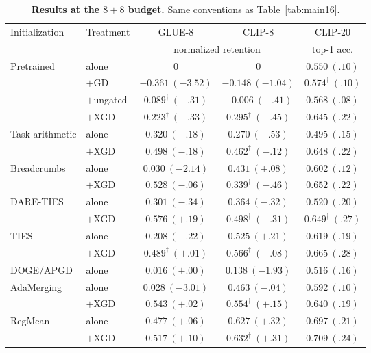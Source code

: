 \documentclass{article} %
\begin{document}
\begin{table}[t]
\centering
\scriptsize
\setlength{\tabcolsep}{3.5pt}
\caption{\textbf{Results at the $8{+}8$ budget.} Same conventions as Table~\ref{tab:main16}.}
\label{tab:main8}
\renewcommand{\arraystretch}{0.95}
\begin{tabular}{llccc}
\toprule
Initialization & Treatment & GLUE-8 & CLIP-8 & CLIP-20 \\
 & & \multicolumn{2}{c}{normalized retention} & top-1 acc. \\
\midrule
Pretrained      & alone      & $0$ & $0$ & $0.550\ (.10)$ \\
                & $+$GD      & $-0.361\ ({-}3.52)$ & $-0.148\ ({-}1.04)$ & $0.574^{\dagger}\ (.10)$ \\
                & $+$ungated & $0.089^{\dagger}\ ({-}.31)$ & $-0.006\ ({-}.41)$ & $0.568\ (.08)$ \\
                & $+$XGD     & $0.223^{\dagger}\ ({-}.33)$ & $0.295^{\dagger}\ ({-}.45)$ & $0.645\ (.22)$ \\
\midrule
Task arithmetic & alone      & $0.320\ ({-}.18)$ & $0.270\ ({-}.53)$ & $0.495\ (.15)$ \\
                & $+$XGD     & $0.498\ ({-}.18)$ & $0.462^{\dagger}\ ({-}.12)$ & $0.648\ (.22)$ \\
\midrule
Breadcrumbs     & alone      & $0.030\ ({-}2.14)$ & $0.431\ ({+}.08)$ & $0.602\ (.12)$ \\
                & $+$XGD     & $0.528\ ({-}.06)$ & $0.339^{\dagger}\ ({-}.46)$ & $0.652\ (.22)$ \\
\midrule
DARE-TIES       & alone      & $0.301\ ({-}.34)$ & $0.364\ ({-}.32)$ & $0.520\ (.20)$ \\
                & $+$XGD     & $\mathbf{0.576}\ ({+}.19)$ & $0.498^{\dagger}\ ({-}.31)$ & $0.649^{\dagger}\ (.27)$ \\
\midrule
TIES            & alone      & $0.208\ ({-}.22)$ & $0.525\ ({+}.21)$ & $0.619\ (.19)$ \\
                & $+$XGD     & $0.489^{\dagger}\ ({+}.01)$ & $0.566^{\dagger}\ ({-}.08)$ & $0.665\ (.28)$ \\
\midrule
DOGE/APGD       & alone      & $0.016\ ({+}.00)$ & $0.138\ ({-}1.93)$ & $0.516\ (.16)$ \\
\midrule
AdaMerging      & alone      & $0.028\ ({-}3.01)$ & $0.463\ ({-}.04)$ & $0.592\ (.10)$ \\
                & $+$XGD     & $0.543\ ({+}.02)$ & $0.554^{\dagger}\ ({+}.15)$ & $0.640\ (.19)$ \\
\midrule
RegMean         & alone      & $0.477\ ({+}.06)$ & $0.627\ ({+}.32)$ & $0.697\ (.21)$ \\
                & $+$XGD     & $0.517\ ({+}.10)$ & $\mathbf{0.632}^{\dagger}\ ({+}.31)$ & $0.709\ (.24)$ \\
\bottomrule
\end{tabular}
\end{table}
\fi
\end{document}
